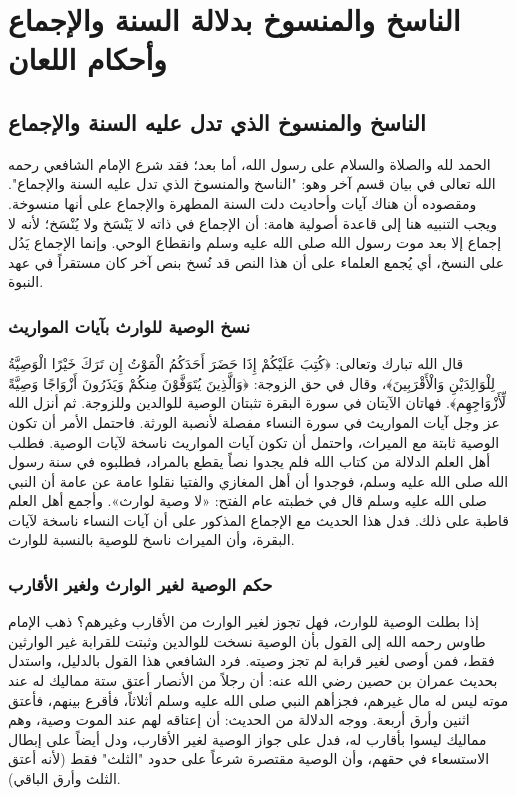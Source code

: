 \chapter{الناسخ والمنسوخ بدلالة السنة والإجماع وأحكام اللعان}

\section{الناسخ والمنسوخ الذي تدل عليه السنة والإجماع}
الحمد لله والصلاة والسلام على رسول الله، أما بعد؛ فقد شرع الإمام الشافعي رحمه الله تعالى في بيان قسم آخر وهو: "الناسخ والمنسوخ الذي تدل عليه السنة والإجماع". ومقصوده أن هناك آيات وأحاديث دلت السنة المطهرة والإجماع على أنها منسوخة.
ويجب التنبيه هنا إلى قاعدة أصولية هامة: أن الإجماع في ذاته لا يَنْسَخ ولا يُنْسَخ؛ لأنه لا إجماع إلا بعد موت رسول الله صلى الله عليه وسلم وانقطاع الوحي. وإنما الإجماع يَدُل على النسخ، أي يُجمع العلماء على أن هذا النص قد نُسخ بنص آخر كان مستقراً في عهد النبوة.

\subsection{نسخ الوصية للوارث بآيات المواريث}
قال الله تبارك وتعالى: ﴿كُتِبَ عَلَيْكُمْ إِذَا حَضَرَ أَحَدَكُمُ الْمَوْتُ إِن تَرَكَ خَيْرًا الْوَصِيَّةُ لِلْوَالِدَيْنِ وَالْأَقْرَبِينَ﴾، وقال في حق الزوجة: ﴿وَالَّذِينَ يُتَوَفَّوْنَ مِنكُمْ وَيَذَرُونَ أَزْوَاجًا وَصِيَّةً لِّأَزْوَاجِهِم﴾. فهاتان الآيتان في سورة البقرة تثبتان الوصية للوالدين وللزوجة.
ثم أنزل الله عز وجل آيات المواريث في سورة النساء مفصلة لأنصبة الورثة. فاحتمل الأمر أن تكون الوصية ثابتة مع الميراث، واحتمل أن تكون آيات المواريث ناسخة لآيات الوصية.
فطلب أهل العلم الدلالة من كتاب الله فلم يجدوا نصاً يقطع بالمراد، فطلبوه في سنة رسول الله صلى الله عليه وسلم، فوجدوا أن أهل المغازي والفتيا نقلوا عامة عن عامة أن النبي صلى الله عليه وسلم قال في خطبته عام الفتح: «لا وصية لوارث». وأجمع أهل العلم قاطبة على ذلك. فدل هذا الحديث مع الإجماع المذكور على أن آيات النساء ناسخة لآيات البقرة، وأن الميراث ناسخ للوصية بالنسبة للوارث.

\subsection{حكم الوصية لغير الوارث ولغير الأقارب}
إذا بطلت الوصية للوارث، فهل تجوز لغير الوارث من الأقارب وغيرهم؟ ذهب الإمام طاوس رحمه الله إلى القول بأن الوصية نسخت للوالدين وثبتت للقرابة غير الوارثين فقط، فمن أوصى لغير قرابة لم تجز وصيته.
فرد الشافعي هذا القول بالدليل، واستدل بحديث عمران بن حصين رضي الله عنه: أن رجلاً من الأنصار أعتق ستة مماليك له عند موته ليس له مال غيرهم، فجزأهم النبي صلى الله عليه وسلم أثلاثاً، فأقرع بينهم، فأعتق اثنين وأرق أربعة.
ووجه الدلالة من الحديث: أن إعتاقه لهم عند الموت وصية، وهم مماليك ليسوا بأقارب له، فدل على جواز الوصية لغير الأقارب، ودل أيضاً على إبطال الاستسعاء في حقهم، وأن الوصية مقتصرة شرعاً على حدود "الثلث" فقط (لأنه أعتق الثلث وأرق الباقي). 

